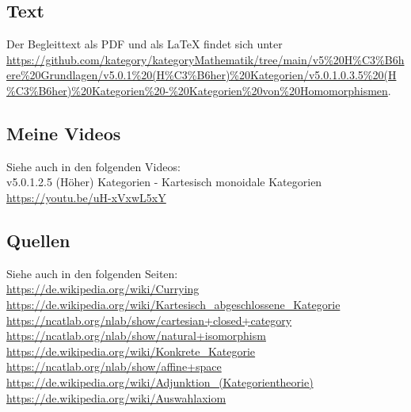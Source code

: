 \documentclass[a4paper]{amsart}
\theoremstyle{definition}
\begin{document}
\subsection*{Text}
Der Begleittext als PDF und als LaTeX findet sich unter
\url{https://github.com/kategory/kategoryMathematik/tree/main/v5%20H%C3%B6here%20Grundlagen/v5.0.1%20(H%C3%B6her)%20Kategorien/v5.0.1.0.3.5%20(H%C3%B6her)%20Kategorien%20-%20Kategorien%20von%20Homomorphismen}.

\subsection*{Meine Videos}
Siehe auch in den folgenden Videos:\\
v5.0.1.2.5 (Höher) Kategorien - Kartesisch monoidale Kategorien\\
\url{https://youtu.be/uH-xVxwL5xY}\\

\subsection*{Quellen}
Siehe auch in den folgenden Seiten:\\
\url{https://de.wikipedia.org/wiki/Currying}\\
\url{https://de.wikipedia.org/wiki/Kartesisch_abgeschlossene_Kategorie}\\
\url{https://ncatlab.org/nlab/show/cartesian+closed+category}\\
\url{https://ncatlab.org/nlab/show/natural+isomorphism}\\
\url{https://de.wikipedia.org/wiki/Konkrete_Kategorie}\\
\url{https://ncatlab.org/nlab/show/affine+space}\\
\url{https://de.wikipedia.org/wiki/Adjunktion_(Kategorientheorie)}\\
\url{https://de.wikipedia.org/wiki/Auswahlaxiom}
\end{document}
